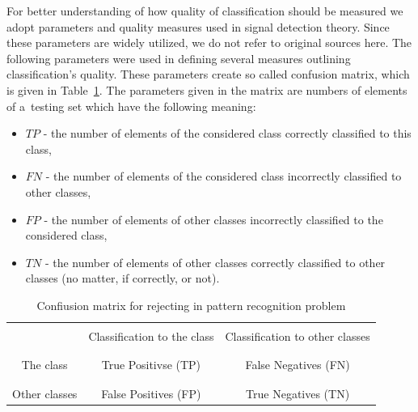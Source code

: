 \documentclass{mini}
\begin{document}
For better understanding of how quality of classification should be measured we adopt parameters and quality measures used in signal detection theory. Since these parameters are widely utilized, we do not refer to original sources here. The following parameters were used in defining several measures outlining classification's quality. These parameters create so called confusion matrix, which is given in Table~\ref{tab:conf_matrix}. The parameters given in the matrix are numbers of elements of a~testing set which have the following meaning:
\begin{itemize}
  \item $TP$ - the number of elements of the considered class correctly classified to this class,
  \item $FN$ - the number of elements of the considered class incorrectly classified to other classes,  
  \item $FP$ - the number of elements of other classes incorrectly classified to the considered class,  
  \item $TN$ - the number of elements of other classes correctly classified to other classes (no matter, if correctly, or not).  
\end{itemize}  

\begin{table}[H]
\vspace{-9pt}
\centering
\begin{tabular}{|c|c|c|}
\hline
  & & \vspace{-6pt}\\
  & \hspace{12pt}Classification to the class\hspace{12pt} & \hspace{3pt}Classification to other classes\hspace{3pt} \\
  & & \vspace{-6pt}\\
\hline 
  & & \vspace{-6pt}\\
  The class & True Positivse (TP) & False Negatives (FN) \\
  & & \vspace{-6pt}\\
\hline
  & & \vspace{-6pt}\\
  \hspace{3pt}Other classes\hspace{3pt} & False Positives (FP) &  True Negatives (TN)\vspace{3pt}\\
\hline
\end{tabular}
\vspace{9pt}
\caption{Confiusion matrix for rejecting in pattern recognition problem}
\label{tab:conf_matrix}
\end{table}
\end{document}
